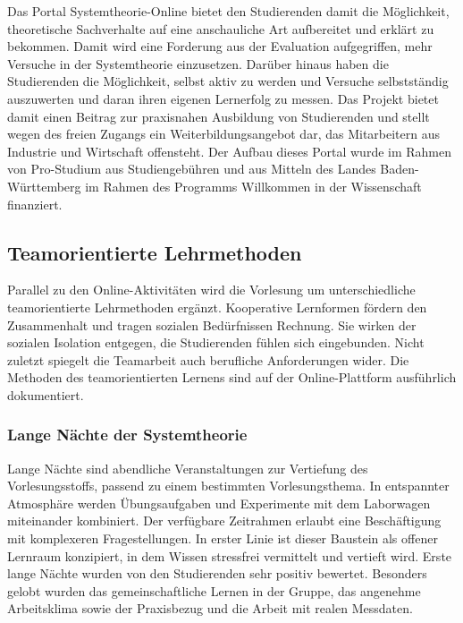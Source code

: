 Das Portal Systemtheorie-Online bietet den Studierenden damit die Möglichkeit, theoretische Sachverhalte auf eine anschauliche Art aufbereitet und erklärt zu bekommen. Damit wird eine Forderung aus der Evaluation aufgegriffen, mehr Versuche in der Systemtheorie einzusetzen. Darüber hinaus haben die Studierenden die Möglichkeit, selbst aktiv zu werden und Versuche selbstständig auszuwerten und daran ihren eigenen Lernerfolg zu messen. Das Projekt bietet damit einen Beitrag zur praxisnahen Ausbildung von Studierenden und stellt wegen des freien Zugangs ein Weiterbildungsangebot dar, das Mitarbeitern aus Industrie und Wirtschaft offensteht. Der Aufbau dieses Portal wurde im Rahmen von Pro-Studium aus Studiengebühren und aus Mitteln des Landes Baden-Württemberg im Rahmen des Programms Willkommen in der Wissenschaft finanziert.

\subsection{Teamorientierte Lehrmethoden}\label{sec:teamorientierte-lehrmethoden}

Parallel zu den Online-Aktivitäten wird die Vorlesung um unterschiedliche teamorientierte Lehrmethoden ergänzt. Kooperative Lernformen fördern den Zusammenhalt und tragen sozialen Bedürfnissen Rechnung. Sie wirken der sozialen Isolation entgegen, die Studierenden fühlen sich eingebunden. Nicht zuletzt spiegelt die Teamarbeit auch berufliche Anforderungen wider. Die Methoden des teamorientierten Lernens sind auf der Online-Plattform ausführlich dokumentiert.

\subsubsection{Lange Nächte der Systemtheorie}\label{sec:lange-nuxe4chte-der-systemtheorie}

Lange Nächte sind abendliche Veranstaltungen zur Vertiefung des Vorlesungsstoffs, passend zu einem bestimmten Vorlesungsthema. In entspannter Atmosphäre werden Übungsaufgaben und Experimente mit dem Laborwagen miteinander kombiniert. Der verfügbare Zeitrahmen erlaubt eine Beschäftigung mit komplexeren Fragestellungen. In erster Linie ist dieser Baustein als offener Lernraum konzipiert, in dem Wissen stressfrei vermittelt und vertieft wird. Erste lange Nächte wurden von den Studierenden sehr positiv bewertet. Besonders gelobt wurden das gemeinschaftliche Lernen in der Gruppe, das angenehme Arbeitsklima sowie der Praxisbezug und die Arbeit mit realen Messdaten.

